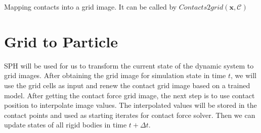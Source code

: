     \begin{algorithm}[!h]
        \caption{Mapping contacts into a grid image. It can be called by $Contacts2grid(\mathbf{x}, \mathcal{C})$}
        \label{contactgrid}
    \end{algorithm}


\section{Grid to Particle}
    SPH will be used for us to transform the current state of the dynamic system to grid images. After obtaining the grid image for simulation state in time $t$, we will use the grid cells as input and renew the contact grid image based on a trained model. After getting the contact force grid image, the next step is to use contact position to interpolate image values. The interpolated values will be stored in the contact points and used as starting iterates for contact force solver. Then we can update states of all rigid bodies in time $t+\Delta{t}$.

